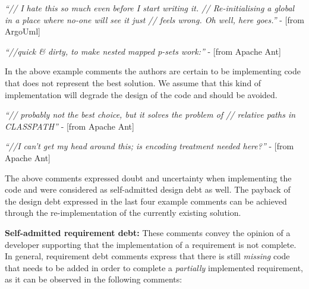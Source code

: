 \vspace{1mm}
    \begin{displayquote}
        \textit{``// I hate this so much even before I start writing it. // Re-initialising a global in a place where no-one will see it just // feels wrong.  Oh well, here goes.''} - [from ArgoUml]
    \end{displayquote}
    \vspace{1mm}
    \begin{displayquote}
        \textit{``//quick \& dirty, to make nested mapped p-sets work:''} - [from Apache Ant]
    \end{displayquote}
\vspace{1mm}

In the above example comments the authors are certain to be implementing code that does not represent the best solution. We assume that this kind of implementation will degrade the design of the code and should be avoided. 

\vspace{1mm}
    \begin{displayquote}
        \textit{``// probably not the best choice, but it solves the problem of // relative paths in CLASSPATH''} - [from Apache Ant]
    \end{displayquote}
    \vspace{1mm}
    \begin{displayquote}   
        \textit{``//I can't get my head around this; is encoding treatment needed here?''} - [from Apache Ant]
    \end{displayquote}
\vspace{1mm}

The above comments expressed doubt and uncertainty when implementing the code and were considered as self-admitted design debt as well.
The payback of the design debt expressed in the last four example comments can be achieved through the re-implementation of the currently existing solution.

\vspace{1mm}
\noindent\textbf{Self-admitted requirement debt:} These comments convey the opinion of a developer supporting that the implementation of a requirement is not complete.  In general, requirement debt comments express
that there is still \emph{missing} code that needs to be added in order to complete a \emph{partially} implemented requirement, as it can be observed in the following comments:

